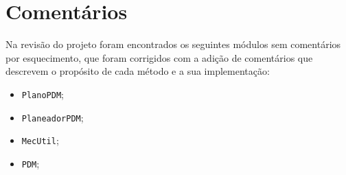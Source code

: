 \section{Comentários}\label{sec:comentarios}

Na revisão do projeto foram encontrados os seguintes módulos sem comentários por esquecimento, que foram corrigidos com a adição de comentários que descrevem o propósito de cada método e a sua implementação:

\begin{itemize}
    \item \texttt{PlanoPDM};
    \item \texttt{PlaneadorPDM};
    \item \texttt{MecUtil};
    \item \texttt{PDM};
\end{itemize}
